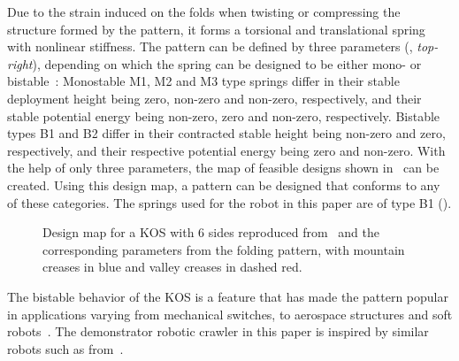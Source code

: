 Due to the strain induced on the folds when twisting or compressing the structure formed by the pattern, it forms a torsional and translational spring with nonlinear stiffness.
The pattern can be defined by three parameters (, \emph{top-right}), depending on which the spring can be designed to be either mono- or bistable~\parencite{Masana2019}:
Monostable M1, M2 and M3 type springs differ in their stable deployment height being zero, non-zero and non-zero, respectively, and their stable potential energy being non-zero, zero and non-zero, respectively.
Bistable types B1 and B2 differ in their contracted stable height being non-zero and zero, respectively, and their respective potential energy being zero and non-zero.
With the help of only three parameters, the map of feasible designs shown in~ can be created.
Using this design map, a pattern can be designed that conforms to any of these categories.
The springs used for the robot in this paper are of type B1 ().

\begin{figure}
        \centering
        \def\svgwidth{.7\linewidth}
        \footnotesize\selectfont
        \caption{Design map for a KOS with 6 sides reproduced from~\textcite{Masana2019} and the corresponding parameters from the folding pattern, with mountain creases in blue and valley creases in dashed red.}
        \label{fig:design-params}
\end{figure}

The bistable behavior of the KOS is a feature that has made the pattern popular in applications varying from mechanical switches, to aerospace structures and soft robots~\parencite{Masana1993}.
The demonstrator robotic crawler in this paper is inspired by similar robots such as from~\textcite{Pagano2017,Ze2022}.
